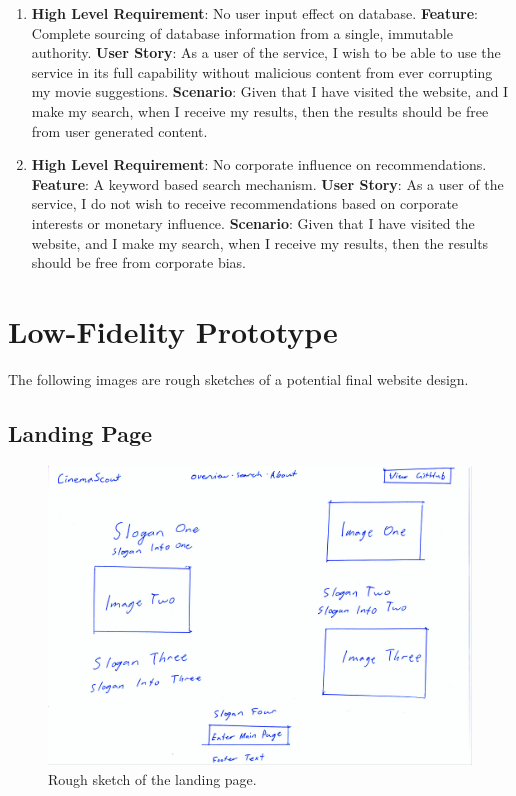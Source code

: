 \documentclass{article}
\begin{document}
\begin{enumerate}
\item
\textbf{High Level Requirement}: No user input effect on database.
\newline
\textbf{Feature}:
Complete sourcing of database information from a single, immutable authority.
\newline
\textbf{User Story}:
As a user of the service, I wish to be able to use the service in its full 
capability without malicious content from ever corrupting my movie suggestions.
\newline
\textbf{Scenario}:
Given that I have visited the website, and I make my search, when I receive my
results, then the results should be free from user generated content.
\newline

\item
\textbf{High Level Requirement}: No corporate influence on recommendations.
\newline
\textbf{Feature}:
A keyword based search mechanism.
\newline
\textbf{User Story}:
As a user of the service, I do not wish to receive recommendations based on
corporate interests or monetary influence.
\newline
\textbf{Scenario}:
Given that I have visited the website, and I make my search, when I receive my
results, then the results should be free from corporate bias.
\newline
\end{enumerate}

\section{Low-Fidelity Prototype}
The following images are rough sketches of a potential final website design.
\subsection{Landing Page}
\begin{figure}[H]
\includegraphics[width=\columnwidth]{res/landing.jpg}
\caption{Rough sketch of the landing page.}
\end{figure}
\end{document}
